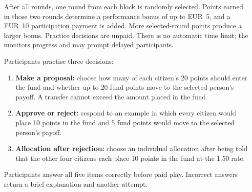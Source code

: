 After all rounds, one round from each block is randomly selected. Points earned in those two rounds determine a performance bonus of up to EUR~5, and a EUR~10 participation payment is added.  More selected-round points produce a larger bonus. Practice decisions are unpaid.  There is no automatic time limit; the  monitors progress and may prompt delayed participants.

Participants practise three decisions:
\begin{enumerate}
  \item \textbf{Make a proposal:} choose how many of each citizen's 20 points should enter the fund and whether up to 20 fund points move to the selected person's payoff. A transfer cannot exceed the amount placed in the fund.
  \item \textbf{Approve or reject:} respond to an example in which every citizen would place 10 points in the fund and 5 fund points would move to the selected person's payoff.
  \item \textbf{Allocation after rejection:} choose an individual allocation after being told that the other four citizens each place 10 points in the fund at the 1.50 rate.
\end{enumerate}

Participants answer all five items correctly before paid play. Incorrect answers return a brief explanation and another attempt.

